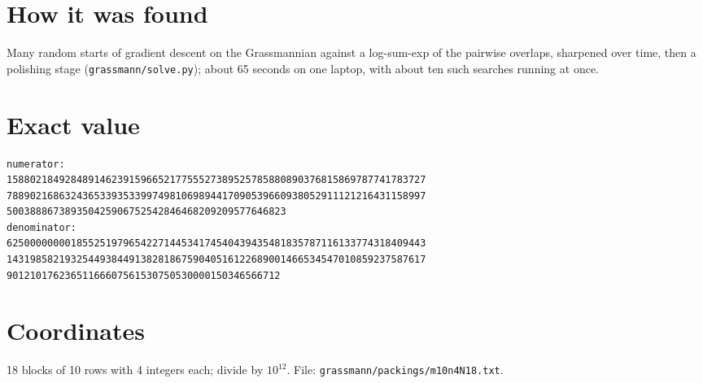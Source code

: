 \documentclass[11pt,a4paper]{article}
\begin{document}
\section{How it was found}
Many random starts of gradient descent on the Grassmannian against a log-sum-exp of the pairwise overlaps, sharpened over time, then a polishing stage (\texttt{grassmann/solve.py}); about 65 seconds on one laptop, with about ten such searches running at once.


\appendix
\section{Exact value}
{\small
\begin{verbatim}
numerator:
158802184928489146239159665217755527389525785880890376815869787741783727
788902168632436533935339974981069894417090539660938052911121216431158997
500388867389350425906752542846468209209577646823
denominator:
625000000001855251979654227144534174540439435481835787116133774318409443
143198582193254493844913828186759040516122689001466534547010859237587617
90121017623651166607561530750530000150346566712
\end{verbatim}}

\section{Coordinates}
18 blocks of 10 rows with 4 integers each; divide by $10^{12}$. File: \texttt{grassmann/packings/m10n4N18.txt}.
{\tiny
\begin{multicols}{3}
\end{multicols}}
\end{document}

